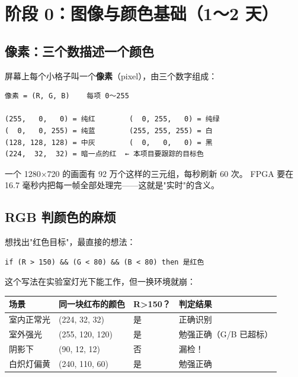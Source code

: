 \documentclass[11pt]{ctexart}
\begin{document}
\section{阶段 0：图像与颜色基础（1～2 天）}

\subsection{像素：三个数描述一个颜色}

屏幕上每个小格子叫一个\textbf{像素}（pixel），由三个数字组成：

\begin{Verbatim}[frame=single,fontsize=\small]
像素 = (R, G, B)    每项 0～255

(255,   0,   0) = 纯红        (  0, 255,   0) = 纯绿
(  0,   0, 255) = 纯蓝        (255, 255, 255) = 白
(128, 128, 128) = 中灰        (  0,   0,   0) = 黑
(224,  32,  32) = 暗一点的红  ← 本项目要跟踪的目标色
\end{Verbatim}

一个 1280×720 的画面有 92 万个这样的三元组，每秒刷新 60 次。
FPGA 要在 16.7 毫秒内把每一帧全部处理完——这就是"实时"的含义。

\subsection{RGB 判颜色的麻烦}

想找出"红色目标"，最直接的想法：

\begin{Verbatim}[frame=single,fontsize=\small]
if (R > 150) && (G < 80) && (B < 80) then 是红色
\end{Verbatim}

这个写法在实验室灯光下能工作，但一换环境就崩：

\begin{center}
\renewcommand{\arraystretch}{1.25}
\begin{tabular}{llll}
\toprule
\rowcolor{rowtint}\textbf{场景} & \textbf{同一块红布的颜色} & \textbf{R>150？} & \textbf{判定结果} \\
\midrule
室内正常光 & (224, 32, 32) & 是 & 正确识别 \\
室外强光 & (255, 120, 120) & 是 & 勉强正确（G/B 已超标） \\
阴影下 & (90, 12, 12) & 否 & \textcolor{huered}{漏检！} \\
白炽灯偏黄 & (240, 110, 60) & 是 & 勉强正确 \\
\bottomrule
\end{tabular}
\end{center}
\end{document}
